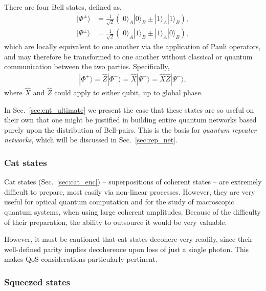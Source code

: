 \documentclass[aps,rmp,twocolumn,amsmath,amssymb,nofootinbib,superscriptaddress,longbibliography,floatfix,table-of-contents,eqsecnum]{revtex4-1}
\newcommand{\ket}[1]{|#1\rangle}
\begin{document}
There are four Bell states, defined as, 
\begin{align} \label{eq:bell_basis}
\ket{\Phi^{\pm}} &= \frac{1}{\sqrt{2}} (\ket{0}_A\ket{0}_B \pm \ket{1}_A\ket{1}_B), \nonumber \\
\ket{\Psi^{\pm}} &= \frac{1}{\sqrt{2}} (\ket{0}_A\ket{1}_B \pm \ket{1}_A\ket{0}_B),
\end{align}
which are locally equivalent to one another via the application of Pauli operators, and may therefore be transformed to one another without classical or quantum communication between the two parties. Specifically,
\begin{align}
\ket{\Phi^+} = \hat{Z}\ket{\Phi^-} = \hat{X}\ket{\Psi^+} = \hat{X}\hat{Z}\ket{\Psi^-},
\end{align}
where $\hat{X}$ and $\hat{Z}$ could apply to either qubit, up to global phase.

In Sec.~\ref{sec:ent_ultimate} we present the case that these states are so useful on their own that one might be justified in building entire quantum networks based purely upon the distribution of Bell-pairs. This is the basis for \textit{quantum repeater networks}, which will be discussed in Sec.~\ref{sec:rep_net}.

%
%

\subsubsection{Cat states} 

Cat states (Sec.~\ref{sec:cat_enc}) -- superpositions of coherent states -- are extremely difficult to prepare, most easily via non-linear processes. However, they are very useful for optical quantum computation and for the study of macroscopic quantum systems, when using large coherent amplitudes. Because of the difficulty of their preparation, the ability to outsource it would be very valuable.

However, it must be cautioned that cat states decohere very readily, since their well-defined parity implies decoherence upon loss of just a single photon. This makes QoS considerations particularly pertinent.

%
%

\subsubsection{Squeezed states} \label{sec:squeezed} 
\end{document}
